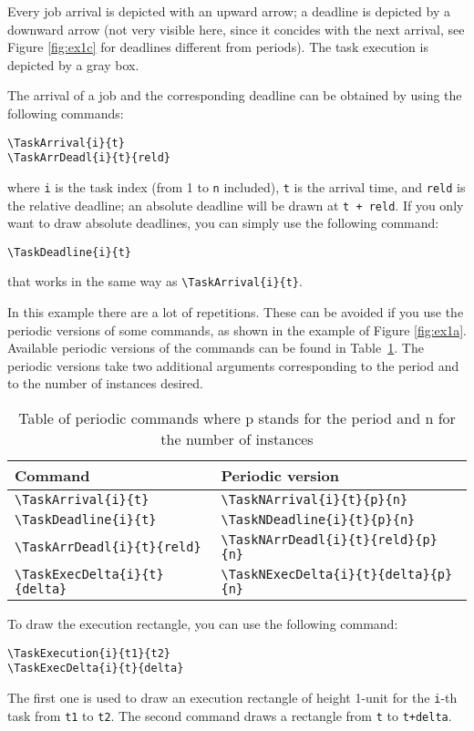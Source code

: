 \documentclass{article}
\begin{document}
Every job arrival is depicted with an upward arrow; a deadline is
depicted by a downward arrow (not very visible here, since it concides
with the next arrival, see Figure \ref{fig:ex1c} for deadlines
different from periods). The task execution is depicted by a gray box.

The arrival of a job and the corresponding deadline can be obtained by
using the following commands:
\begin{verbatim}
\TaskArrival{i}{t}
\TaskArrDeadl{i}{t}{reld}
\end{verbatim}
\noindent where \texttt{i} is the task index (from 1 to \texttt{n}
included), \texttt{t} is the arrival time, and \texttt{reld} is the
relative deadline; an absolute deadline will be drawn at \texttt{t +
  reld}. If you only want to draw absolute deadlines, you can simply use the following command:
\begin{verbatim}
\TaskDeadline{i}{t}
\end{verbatim}
\noindent that works in the same way as \verb+\TaskArrival{i}{t}+.


In this example there are a lot of repetitions. These can be avoided
if you use the periodic versions of some commands, as shown in the example of
Figure \ref{fig:ex1a}. Available periodic versions of the commands can be found in Table~\ref{tab:periodic_versions}. The periodic versions take two additional arguments corresponding to the period and to the number of instances desired.

\begin{table}[!htbp]
\begin{tabular}{|l|l|}
 \hline
  Command & Periodic version  \\
 \hline
 \verb+\TaskArrival{i}{t}+ & \verb+\TaskNArrival{i}{t}{p}{n}+ \\
 \verb+\TaskDeadline{i}{t}+ & \verb+\TaskNDeadline{i}{t}{p}{n}+ \\
 \verb+\TaskArrDeadl{i}{t}{reld}+ & \verb+\TaskNArrDeadl{i}{t}{reld}{p}{n}+  \\
 \verb+\TaskExecDelta{i}{t}{delta}+ & \verb+\TaskNExecDelta{i}{t}{delta}{p}{n}+\\
  \hline
\end{tabular}
\caption{Table of periodic commands where p stands for the period and n for the number of instances}
\label{tab:periodic_versions}
\end{table}



To draw the execution rectangle, you can use the following command:
\begin{verbatim}
\TaskExecution{i}{t1}{t2}
\TaskExecDelta{i}{t}{delta}
\end{verbatim}
The first one is used to draw an execution rectangle of height 1-unit
for the \texttt{i}-th task from \texttt{t1} to \texttt{t2}. The second
command draws a rectangle from \texttt{t} to \texttt{t+delta}.
\end{document}
